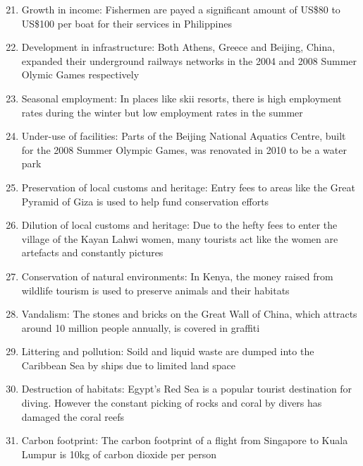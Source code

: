 \documentclass[oneside]{book}
\begin{document}
\newpage
\begin{minipage}{0.5\textwidth}
  \begin{enumerate}
    \setcounter{enumi}{20}
    \item Growth in income: Fishermen are payed a significant amount of US\$80 to US\$100 per boat for their services in Philippines
    
    \item Development in infrastructure: Both Athens, Greece and Beijing, China, expanded their underground railways networks in the 2004 and 2008 Summer Olymic Games respectively
    
    \item Seasonal employment: In places like skii resorts, there is high employment rates during the winter but low employment rates in the summer
    
    \item Under-use of facilities: Parts of the Beijing National Aquatics Centre, built for the 2008 Summer Olympic Games, was renovated in 2010 to be a water park
    
    \item Preservation of local customs and heritage: Entry fees to areas like the Great Pyramid of Giza is used to help fund conservation efforts
    
    \item Dilution of local customs and heritage: Due to the hefty fees to enter the village of the Kayan Lahwi women, many tourists act like the women are artefacts and constantly pictures
    
    \item Conservation of natural environments: In Kenya, the money raised from wildlife tourism is used to preserve animals and their habitats
    
    \item Vandalism: The stones and bricks on the Great Wall of China, which attracts around 10 million people annually, is covered in graffiti
    
    \item Littering and pollution: Soild and liquid waste are dumped into the Caribbean Sea by ships due to limited land space
    
    \item Destruction of habitats: Egypt’s Red Sea is a popular tourist destination for diving. However the constant picking of rocks and coral by divers has damaged the coral reefs
    
    \item Carbon footprint: The carbon footprint of a flight from Singapore to Kuala Lumpur is 10kg of carbon dioxide per person
  \end{enumerate}
\end{minipage}
\end{document}
